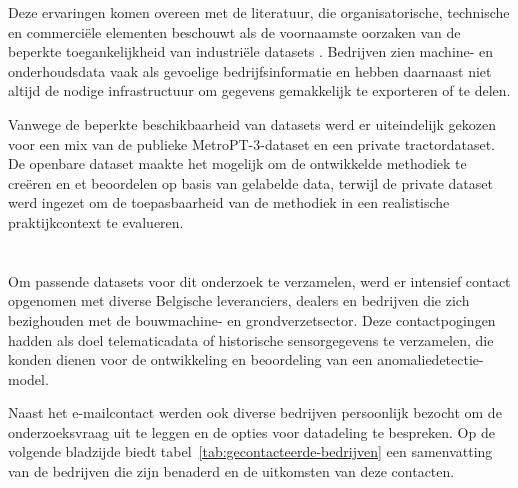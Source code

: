 Deze ervaringen komen overeen met de literatuur, die organisatorische, technische en commerciële elementen beschouwt als de voornaamste oorzaken van de beperkte toegankelijkheid van industriële datasets \autocite{Dissem2024, Elahi2023, Wang2025}. Bedrijven zien machine- en onderhoudsdata vaak als gevoelige bedrijfsinformatie en hebben daarnaast niet altijd de nodige infrastructuur om gegevens gemakkelijk te exporteren of te delen.

Vanwege de beperkte beschikbaarheid van datasets werd er uiteindelijk gekozen voor een mix van de publieke MetroPT-3-dataset en een private tractordataset. De openbare dataset maakte het mogelijk om de ontwikkelde methodiek te creëren en et beoordelen op basis van gelabelde data, terwijl de private dataset werd ingezet om de toepasbaarheid van de methodiek in een realistische praktijkcontext te evalueren.

\section{}%
\label{sec: De praktische zoektocht naar datasets}

Om passende datasets voor dit onderzoek te verzamelen, werd er intensief contact opgenomen met diverse Belgische leveranciers, dealers en bedrijven die zich bezighouden met de bouwmachine- en grondverzetsector. Deze contactpogingen hadden als doel telematicadata of historische sensorgegevens te verzamelen, die konden dienen voor de ontwikkeling en beoordeling van een anomaliedetectie-model.

Naast het e-mailcontact werden ook diverse bedrijven persoonlijk bezocht om de onderzoeksvraag uit te leggen en de opties voor datadeling te bespreken. Op de volgende bladzijde biedt tabel~\ref{tab:gecontacteerde-bedrijven} een samenvatting van de bedrijven die zijn benaderd en de uitkomsten van deze contacten.

